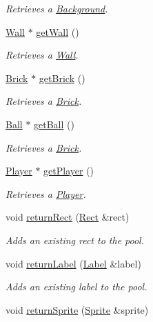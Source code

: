 \begin{DoxyCompactItemize}
\begin{DoxyCompactList}\small\item\em Retrieves a \hyperlink{class_background}{Background}. \end{DoxyCompactList}\item 
\hyperlink{class_wall}{Wall} $\ast$ \hyperlink{class_pool_a0ac76b81263346b168a482c6407ae9e0}{get\+Wall} ()
\begin{DoxyCompactList}\small\item\em Retrieves a \hyperlink{class_wall}{Wall}. \end{DoxyCompactList}\item 
\hyperlink{class_brick}{Brick} $\ast$ \hyperlink{class_pool_a9a51a508e2d90cb62888dd64ebf16a92}{get\+Brick} ()
\begin{DoxyCompactList}\small\item\em Retrieves a \hyperlink{class_brick}{Brick}. \end{DoxyCompactList}\item 
\hyperlink{class_ball}{Ball} $\ast$ \hyperlink{class_pool_a6a45dbea615300cf7baa1c449983f9ce}{get\+Ball} ()
\begin{DoxyCompactList}\small\item\em Retrieves a \hyperlink{class_brick}{Brick}. \end{DoxyCompactList}\item 
\hyperlink{class_player}{Player} $\ast$ \hyperlink{class_pool_a15d6bbd0901a4a77fd55eb0b69d965ef}{get\+Player} ()
\begin{DoxyCompactList}\small\item\em Retrieves a \hyperlink{class_player}{Player}. \end{DoxyCompactList}\item 
void \hyperlink{class_pool_a3b5250c08babf163d9d4877c7a2a6f40}{return\+Rect} (\hyperlink{class_rect}{Rect} \&rect)
\begin{DoxyCompactList}\small\item\em Adds an existing rect to the pool. \end{DoxyCompactList}\item 
void \hyperlink{class_pool_a2a38a2d1aa883152d27fa213ac2cc2e8}{return\+Label} (\hyperlink{class_label}{Label} \&label)
\begin{DoxyCompactList}\small\item\em Adds an existing label to the pool. \end{DoxyCompactList}\item 
void \hyperlink{class_pool_a227334c0983a0c1bf42d72a44fcfee8f}{return\+Sprite} (\hyperlink{class_sprite}{Sprite} \&sprite)

\end{DoxyCompactItemize}
